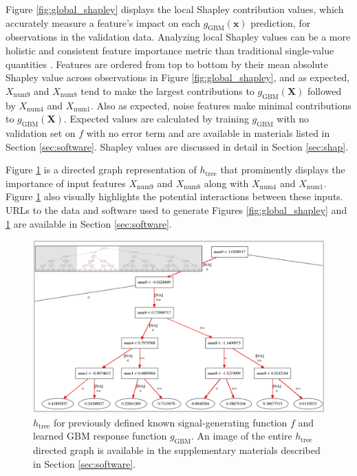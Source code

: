 \documentclass[sigconf, review]{acmart}
\begin{document}
Figure \ref{fig:global_shapley} displays the local Shapley contribution values, which accurately measure a feature's impact on each $g_{\text{GBM}}(\mathbf{x})$ prediction, for observations in the validation data. Analyzing local Shapley values can be a more holistic and consistent feature importance metric than traditional single-value quantities \cite{shapley}. Features are ordered from top to bottom by their mean absolute Shapley value across observations in Figure \ref{fig:global_shapley}, and as expected, $X_{\text{num}9}$ and $X_{\text{num}8}$ tend to make the largest contributions to $g_{\text{GBM}}(\mathbf{X})$ followed by $X_{\text{num}4}$ and $X_{\text{num}1}$. Also as expected, noise features make minimal contributions to $g_{\text{GBM}}(\mathbf{X})$. Expected values are calculated by training $g_{\text{GBM}}$ with no validation set on $f$ with no error term and are available in materials listed in Section \ref{sec:software}. Shapley values are discussed in detail in Section \ref{sec:shap}. 

Figure \ref{fig:dt_surrogate} is a directed graph representation of $h_{\text{tree}}$ that prominently displays the importance of input features $X_{\text{num}9}$ and $X_{\text{num}8}$ along with $X_{\text{num}4}$ and $X_{\text{num}1}$. Figure \ref{fig:dt_surrogate} also visually highlights the potential interactions between these inputs. URLs to the data and software used to generate Figures \ref{fig:global_shapley} and \ref{fig:dt_surrogate} are available in Section \ref{sec:software}.

\begin{figure}[htb]
	\begin{center}
		\includegraphics[scale=0.27]{img/figure_3.eps}
		\caption{$h_{\text{tree}}$ for previously defined known signal-generating function $f$ and learned GBM response function $g_{\text{GBM}}$. An image of the entire $h_{\text{tree}}$ directed graph is available in the supplementary materials described in Section \ref{sec:software}.}
		\label{fig:dt_surrogate}
	\end{center}
\end{figure}
\end{document}
